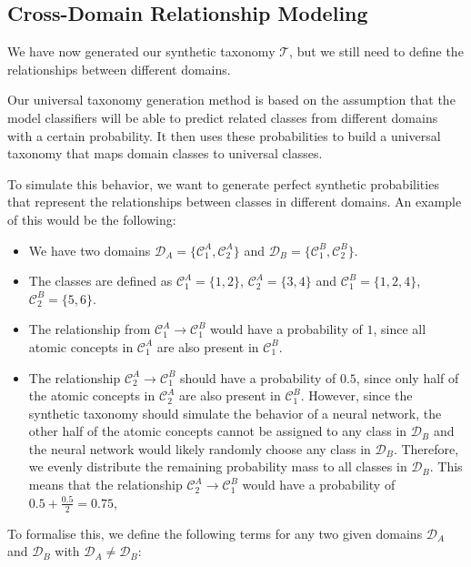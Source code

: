 \subsection{Cross-Domain Relationship Modeling}

We have now generated our synthetic taxonomy $\mathcal{T}$,
but we still need to define the relationships between different domains.

Our universal taxonomy generation method is based on the assumption
that the model classifiers will be able to predict related classes
from different domains with a certain probability.
It then uses these probabilities to build a universal taxonomy
that maps domain classes to universal classes.

To simulate this behavior, we want to generate perfect synthetic probabilities
that represent the relationships between classes in different domains.
An example of this would be the following:
\begin{itemize}
    \item We have two domains $\mathcal{D}_A = \{\mathcal{C}_1^A, \mathcal{C}_2^A\}$ and $\mathcal{D}_B = \{\mathcal{C}_1^B, \mathcal{C}_2^B\}$.
    \item The classes are defined as $\mathcal{C}_1^A = \{1, 2\}$, $\mathcal{C}_2^A = \{3, 4\}$ and $\mathcal{C}_1^B = \{1, 2, 4\}$, $\mathcal{C}_2^B = \{5, 6\}$.
    \item The relationship from $\mathcal{C}_1^A\rightarrow\mathcal{C}_1^B$ would have a probability of $1$,
          since all atomic concepts in $\mathcal{C}_1^A$ are also present in $\mathcal{C}_1^B$.
    \item The relationship $\mathcal{C}_2^A\rightarrow\mathcal{C}_1^B$ should have a probability of $0.5$,
          since only half of the atomic concepts in $\mathcal{C}_2^A$ are also present in $\mathcal{C}_1^B$.
          However, since the synthetic taxonomy should simulate the behavior of a neural network,
          the other half of the atomic concepts cannot be assigned to any class in $\mathcal{D}_B$
          and the neural network would likely randomly choose any class in $\mathcal{D}_B$.
          Therefore, we evenly distribute the remaining probability mass to all classes in $\mathcal{D}_B$.
          This means that the relationship $\mathcal{C}_2^A\rightarrow\mathcal{C}_1^B$ would have a probability of $0.5 + \frac{0.5}{2} = 0.75$,
\end{itemize}

To formalise this, we define the following terms for any two given domains $\mathcal{D}_A$ and $\mathcal{D}_B$ with $\mathcal{D}_A \neq \mathcal{D}_B$:

